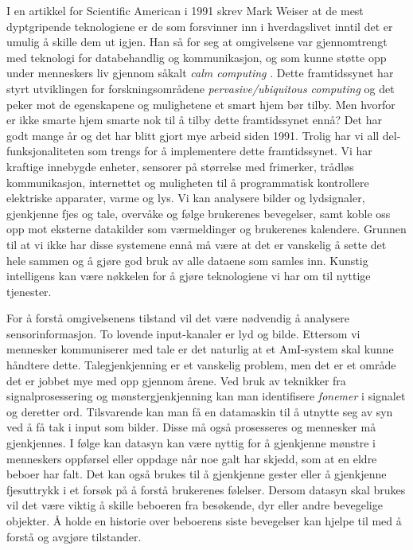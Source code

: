 {I en artikkel for Scientific American i 1991 skrev Mark Weiser at de mest dyptgripende teknologiene er de som forsvinner inn i hverdagslivet inntil det er umulig å skille dem ut igjen. Han så for seg at omgivelsene var gjennomtrengt med teknologi for databehandlig og kommunikasjon, og som kunne støtte opp under menneskers liv gjennom såkalt \emph{calm computing} \citet{weiser91}. Dette framtidssynet har styrt utviklingen for forskningsområdene \emph{pervasive/ubiquitous computing} og det peker mot de egenskapene og mulighetene et smart hjem bør tilby. Men hvorfor er ikke smarte hjem smarte nok til å tilby dette framtidssynet ennå? Det har godt mange år og det har blitt gjort mye arbeid siden 1991. Trolig har vi all del-funksjonaliteten som trengs for å implementere dette framtidssynet. Vi har kraftige innebygde enheter, sensorer på størrelse med frimerker, trådløs kommunikasjon, internettet og muligheten til å programmatisk kontrollere elektriske apparater, varme og lys. Vi kan analysere bilder og lydsignaler, gjenkjenne fjes og tale, overvåke og følge brukerenes bevegelser, samt koble oss opp mot eksterne datakilder som værmeldinger og brukerenes kalendere. Grunnen til at vi ikke har disse systemene ennå må være at det er vanskelig å sette det hele sammen og å gjøre god bruk av alle dataene som samles inn. Kunstig intelligens kan være nøkkelen for å gjøre teknologiene vi har om til nyttige tjenester.

For å forstå omgivelsenens tilstand vil det være nødvendig å analysere sensorinformasjon. To lovende input-kanaler er lyd og bilde. Ettersom vi mennesker kommuniserer med tale er det naturlig at et AmI-system skal kunne håndtere dette. Talegjenkjenning er et vanskelig problem, men det er et område det er jobbet mye med opp gjennom årene. Ved bruk av teknikker fra signalprosessering og mønstergjenkjenning kan man identifisere \emph{fonemer} i signalet og deretter ord. Tilsvarende kan man få en datamaskin til å utnytte seg av syn ved å få tak i input som bilder. Disse må også prosesseres og mennesker må gjenkjennes. I følge \citet{augustonugent06} kan datasyn kan være nyttig for å gjenkjenne mønstre i menneskers oppførsel eller oppdage når noe galt har skjedd, som at en eldre beboer har falt. Det kan også brukes til å gjenkjenne gester eller å gjenkjenne fjesuttrykk i et forsøk på å forstå brukerenes følelser. Dersom datasyn skal brukes vil det være viktig å skille beboeren fra besøkende, dyr eller andre bevegelige objekter. Å holde en historie over beboerens siste bevegelser kan hjelpe til med å forstå og avgjøre tilstander.

}
